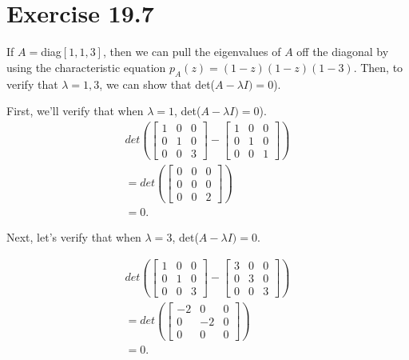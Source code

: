 \documentclass[11pt]{article}
\begin{document}
\pagebreak
\section*{Exercise 19.7}
If $A = $diag$[1,1,3]$, then we can pull the eigenvalues of $A$ off the diagonal
by using the characteristic equation $p_A(z) = (1-z)(1-z)(1-3)$. Then, to verify
that $\lambda = 1, 3$, we can show that det($A-\lambda I) = 0$). 

First, we'll verify that when $\lambda = 1$, det($A - \lambda I) = 0$).
\begin{align*}
    det(\left[\begin{array}{ccc}
    1 & 0 & 0\\
    0 & 1 & 0\\
    0 & 0 & 3
    \end{array}\right]
    -
    \left[ \begin{array}{ccc}
    1 & 0 & 0\\
    0 & 1 & 0\\
    0 & 0 & 1
    \end{array}\right])\\
    = det(\left[\begin{array}{ccc}
    0 & 0 & 0\\
    0 & 0 & 0\\
    0 & 0 & 2
    \end{array}\right])\\
    = 0.
\end{align*}

Next, let's verify that when $\lambda = 3$, det($A - \lambda I) = 0$.

\begin{align*}
    det(\left[\begin{array}{ccc}
    1 & 0 & 0\\
    0 & 1 & 0\\
    0 & 0 & 3
    \end{array}\right]
    -
    \left[ \begin{array}{ccc}
    3 & 0 & 0\\
    0 & 3 & 0\\
    0 & 0 & 3
    \end{array}\right])\\
    = det(\left[\begin{array}{ccc}
    -2 & 0 & 0\\
    0 & -2 & 0\\
    0 & 0  & 0
    \end{array}\right])\\
    = 0.
\end{align*}
\pagebreak
\end{document}

